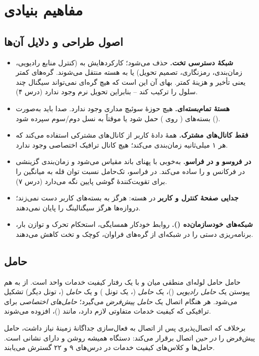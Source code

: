 \documentclass[11pt,a4paper]{article}
\begin{document}
\section{مفاهیم بنیادی}

\subsection{اصول طراحی و دلایل آن‌ها}
\begin{itemize}
  \item \textbf{شبکهٔ دسترسی تخت.}  حذف می‌شود؛ کارکردهایش به  (کنترل منابع
        رادیویی، زمان‌بندی، رمزنگاری، تصمیم تحویل) یا به هسته منتقل می‌شوند. گره‌های کمتر یعنی تأخیر
        و هزینهٔ کمتر. بهای آن این است که هیچ گره‌ای نمی‌تواند سیگنال چند سلول را ترکیب کند -- بنابراین
        تحویل نرم وجود ندارد (درس ۴).
  \item \textbf{هستهٔ تمام‌بسته‌ای.} هیچ حوزهٔ سوئیچ مداری وجود ندارد. صدا باید به‌صورت بسته‌های
         ( روی ) حمل شود یا موقتاً به نسل دوم/سوم سپرده شود ().
  \item \textbf{فقط کانال‌های مشترک.} همهٔ دادهٔ کاربر از کانال‌های مشترکی استفاده می‌کند که 
        هر ۱ میلی‌ثانیه زمان‌بندی می‌کند؛ هیچ کانال ترافیک اختصاصی وجود ندارد.
  \item \textbf{ در فروسو و  در فراسو.}  به‌خوبی با پهنای باند
        مقیاس می‌شود و زمان‌بندی گزینشی در فرکانس و  را ساده می‌کند. در فراسو، 
        تک‌حامل نسبت توان قله به میانگین را برای تقویت‌کنندهٔ گوشی پایین نگه می‌دارد (درس ۷).
  \item \textbf{جدایی صفحهٔ کنترل و کاربر} در هسته:  هرگز به بسته‌های کاربر دست نمی‌زند؛
        دروازه‌ها هرگز سیگنالینگ  را پایان نمی‌دهند.
  \item \textbf{شبکه‌های خودسازمان‌ده ().} روابط خودکار همسایگی، استحکام تحرک و توازن بار،
        برنامه‌ریزی دستی را در شبکه‌ای از گره‌های فراوان، کوچک و تخت کاهش می‌دهند.
\end{itemize}

\subsection{حامل }
\begin{definitionbox}{حامل }
حامل  لوله‌ای منطقی میان  و  با یک رفتار کیفیت خدمات واحد است. از به هم
پیوستن یک \emph{حامل رادیویی} ()، یک \emph{حامل } (، یک تونل
) و یک \emph{حامل } (، تونل  دیگر) تشکیل می‌شود. هر
 هنگام اتصال یک \emph{حامل پیش‌فرض} می‌گیرد؛ \emph{حامل‌های اختصاصی} برای ترافیکی که
کیفیت خدمات متفاوتی لازم دارد، مانند  ()، افزوده می‌شوند.
\end{definitionbox}
برخلاف  که اتصال‌پذیری پس از اتصال به فعال‌سازی جداگانهٔ زمینهٔ  نیاز داشت،
 حامل پیش‌فرض را \emph{در حین} اتصال برقرار می‌کند: دستگاه  همیشه روشن و دارای
نشانی  است. حامل‌ها و کلاس‌های کیفیت خدمات در درس‌های ۹ و ۲۲ گسترش می‌یابند.
\end{document}
